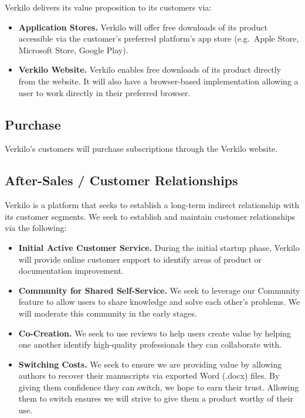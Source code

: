\documentclass[10pt,openany]{book}
\providecommand{\tightlist}{%
  \setlength{\itemsep}{0pt}\setlength{\parskip}{0pt}}
\begin{document}
Verkilo delivers its value proposition to its customers via:

\begin{itemize}
\tightlist
\item
  \textbf{Application Stores.} Verkilo will offer free downloads of its
  product accessible via the customer's preferred platform's app store
  (e.g.~Apple Store, Microsoft Store, Google Play).
\item
  \textbf{Verkilo Website.} Verkilo enables free downloads of its
  product directly from the website. It will also have a browser-based
  implementation allowing a user to work directly in their preferred
  browser.
\end{itemize}

\hypertarget{purchase}{%
\subsection{Purchase}\label{purchase}}

Verkilo's customers will purchase subscriptions through the Verkilo
website.

\hypertarget{after-sales-customer-relationships}{%
\subsection{After-Sales / Customer
Relationships}\label{after-sales-customer-relationships}}

Verkilo is a platform that seeks to establish a long-term indirect
relationship with its customer segments. We seek to establish and
maintain customer relationships via the following:

\begin{itemize}
\tightlist
\item
  \textbf{Initial Active Customer Service.} During the initial startup
  phase, Verkilo will provide online customer support to identify areas
  of product or documentation improvement.
\item
  \textbf{Community for Shared Self-Service.} We seek to leverage our
  Community feature to allow users to share knowledge and solve each
  other's problems. We will moderate this community in the early stages.
\item
  \textbf{Co-Creation.} We seek to use reviews to help users create
  value by helping one another identify high-quality professionals they
  can collaborate with.
\item
  \textbf{Switching Costs.} We seek to ensure we are providing value by
  allowing authors to recover their manuscripts via exported Word
  (.docx) files. By giving them confidence they can switch, we hope to
  earn their trust. Allowing them to switch ensures we will strive to
  give them a product worthy of their use.
\end{itemize}
\end{document}
